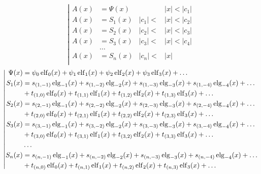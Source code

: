 \begin{equation*} \left| \begin{aligned}
A(x) &= \Psi(x) & 
&|x| < |c_1| \\
%
A(x) &= S_1(x) & 
|c_1| < &|x| < |c_2| \\
%
A(x) &= S_2(x) & 
|c_2| < &|x| < |c_3| \\
%
A(x) &= S_3(x) &
|c_3| < &|x| < |c_4| \\
&\ldots & & \\
%
A(x) &= S_n(x) &
|c_n| < &|x| \\
\end{aligned} \right. \end{equation*}
%
\begin{equation*} \left| \begin{aligned}
\Psi(x) &=
  \psi_0 \elf_0(x)
+ \psi_1 \elf_1(x) 
+ \psi_2 \elf_2(x) 
+ \psi_3 \elf_3(x) 
+ \ldots \\
%
S_1(x) &= 
  s_{(1,-1)} \elg_{-1}(x)
+ s_{(1,-2)} \elg_{-2}(x)
+ s_{(1,-3)} \elg_{-3}(x)
+ s_{(1,-4)} \elg_{-4}(x)
+ \ldots \\ &
+ t_{(1,0)} \elf_0(x)
+ t_{(1,1)} \elf_1(x)
+ t_{(1,2)} \elf_2(x)
+ t_{(1,3)} \elf_3(x)
+ \ldots \\
%
S_2(x) &= 
  s_{(2,-1)} \elg_{-1}(x)
+ s_{(2,-2)} \elg_{-2}(x)
+ s_{(2,-3)} \elg_{-3}(x)
+ s_{(2,-4)} \elg_{-4}(x)
+ \ldots \\ &
+ t_{(2,0)} \elf_0(x)
+ t_{(2,1)} \elf_1(x)
+ t_{(2,2)} \elf_2(x)
+ t_{(2,3)} \elf_3(x)
+ \ldots \\
%
S_3(x) &= 
  s_{(3,-1)} \elg_{-1}(x)
+ s_{(3,-2)} \elg_{-2}(x)
+ s_{(3,-3)} \elg_{-3}(x)
+ s_{(3,-4)} \elg_{-4}(x)
+ \ldots \\ &
+ t_{(3,0)} \elf_0(x)
+ t_{(3,1)} \elf_1(x)
+ t_{(3,2)} \elf_2(x)
+ t_{(3,3)} \elf_3(x)
+ \ldots \\
%
&\ldots \\
%
S_n(x) &= 
  s_{(n,-1)} \elg_{-1}(x)
+ s_{(n,-2)} \elg_{-2}(x)
+ s_{(n,-3)} \elg_{-3}(x)
+ s_{(n,-4)} \elg_{-4}(x)
+ \ldots \\ &
+ t_{(n,0)} \elf_0(x)
+ t_{(n,1)} \elf_1(x)
+ t_{(n,2)} \elf_2(x)
+ t_{(n,3)} \elf_3(x)
+ \ldots \\
\end{aligned} \right. \end{equation*}

